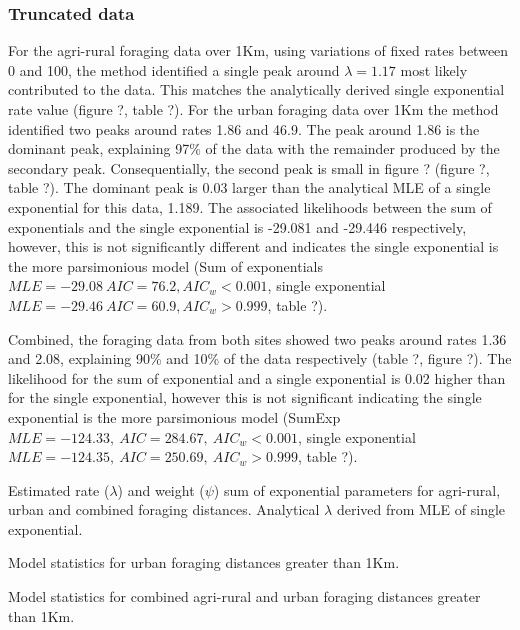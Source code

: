 \documentclass[11pt,usenames,dvipsnames]{article}
\begin{document}
\subsubsection{Truncated data}

For the agri-rural foraging data over 1Km, using variations of fixed rates between 0 and 100, the method identified a single peak around $\lambda = 1.17$ most likely contributed to the data. This matches the analytically derived single exponential rate value (figure ?, table ?). For the urban foraging data over 1Km the method identified two peaks around rates 1.86 and 46.9. The peak around 1.86 is the dominant peak, explaining 97\% of the data with the remainder produced by the secondary peak. Consequentially, the second peak is small in figure ? (figure ?, table ?). The dominant peak is 0.03 larger than the analytical MLE of a single exponential for this data, 1.189. The associated likelihoods between the sum of exponentials and the single exponential is -29.081 and -29.446 respectively, however, this is not significantly different and indicates the single exponential is the more parsimonious model (Sum of exponentials $MLE = -29.08\ AIC = 76.2, AIC_w < 0.001$, single exponential $MLE = -29.46\ AIC = 60.9, AIC_w > 0.999$, table ?). 

Combined, the foraging data from both sites showed two peaks around rates 1.36 and 2.08, explaining 90\% and 10\% of the data respectively (table ?, figure ?). The likelihood for the sum of exponential and a single exponential is 0.02 higher than for the single exponential, however this is not significant indicating the single exponential is the more parsimonious model (SumExp $MLE = -124.33,\ AIC = 284.67,\ AIC_w < 0.001$, single exponential $MLE = -124.35,\ AIC = 250.69,\ AIC_w > 0.999$, table ?).

\begin{table}[H]
	\centering
	\caption{Estimated rate ($\lambda$) and weight ($\psi$) sum of exponential parameters for agri-rural, urban and combined foraging distances. Analytical $\lambda$ derived from MLE of single exponential.}
	
\end{table}

\begin{table}[H]
	\centering
	\caption{Model statistics for urban foraging distances greater than 1Km.}
	
\end{table}

\begin{table}[H]
	\centering
	\caption{Model statistics for combined agri-rural and urban foraging distances greater than 1Km.}
	
\end{table}
\end{document}
